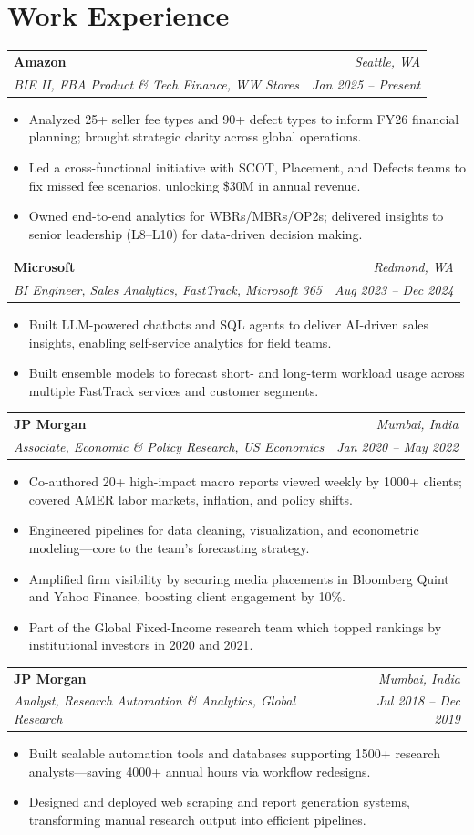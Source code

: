 \documentclass[10pt,letterpaper]{article}
\makeatletter
\newcommand{\resumeItem}[1]{\item\small{#1\vspace{-2pt}}}
\newcommand{\resumeSubheading}[4]{
  \vspace{1pt}
  \begin{tabularx}{\textwidth}{@{}>{\raggedright\arraybackslash}X@{}r@{}}
    \textbf{\small #1} & \textit{\footnotesize #2} \\
    \textit{\footnotesize #3} & \textit{\footnotesize #4} \\
  \end{tabularx}
  \vspace{-1pt}
}
\makeatother
\begin{document}
\section{Work Experience}

\resumeSubheading
  {Amazon}{Seattle, WA}
  {BIE II, FBA Product \& Tech Finance, WW Stores}{Jan 2025 -- Present}
\begin{itemize}
  \resumeItem{Analyzed 25+ seller fee types and 90+ defect types to inform FY26 financial planning; brought strategic clarity across global operations.}
  \resumeItem{Led a cross-functional initiative with SCOT, Placement, and Defects teams to fix missed fee scenarios, unlocking \$30M in annual revenue.}
  \resumeItem{Owned end-to-end analytics for WBRs/MBRs/OP2s; delivered insights to senior leadership (L8--L10) for data-driven decision making.}
\end{itemize}

\resumeSubheading
  {Microsoft}{Redmond, WA}
  {BI Engineer, Sales Analytics, FastTrack, Microsoft 365}{Aug 2023 -- Dec 2024}
\begin{itemize}
  \resumeItem{Built LLM-powered chatbots and SQL agents to deliver AI-driven sales insights, enabling self-service analytics for field teams.}
  \resumeItem{Built ensemble models to forecast short- and long-term workload usage across multiple FastTrack services and customer segments.}
\end{itemize}

\resumeSubheading
  {JP Morgan}{Mumbai, India}
  {Associate, Economic \& Policy Research, US Economics}{Jan 2020 -- May 2022}
\begin{itemize}
  \resumeItem{Co-authored 20+ high-impact macro reports viewed weekly by 1000+ clients; covered AMER labor markets, inflation, and policy shifts.}
  \resumeItem{Engineered pipelines for data cleaning, visualization, and econometric modeling---core to the team's forecasting strategy.}
  \resumeItem{Amplified firm visibility by securing media placements in Bloomberg Quint and Yahoo Finance, boosting client engagement by 10\%.}
  \resumeItem{Part of the Global Fixed-Income research team which topped rankings by institutional investors in 2020 and 2021.}
\end{itemize}

\resumeSubheading
  {JP Morgan}{Mumbai, India}
  {Analyst, Research Automation \& Analytics, Global Research}{Jul 2018 -- Dec 2019}
\begin{itemize}
  \resumeItem{Built scalable automation tools and databases supporting 1500+ research analysts---saving 4000+ annual hours via workflow redesigns.}
  \resumeItem{Designed and deployed web scraping and report generation systems, transforming manual research output into efficient pipelines.}
\end{itemize}
\end{document}
